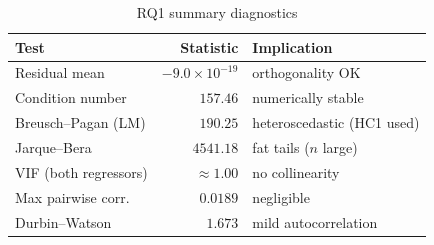 \documentclass[conference]{IEEEtran}
\begin{document}
\begin{table}[!t]
\caption{RQ1 summary diagnostics}
\label{tab:app_mlr}
\centering
\small
\begin{tabular}{lrl}
\toprule
Test & Statistic & Implication \\
\midrule
Residual mean         & $-9.0\times10^{-19}$ & orthogonality OK \\
Condition number      & $157.46$ & numerically stable \\
Breusch--Pagan (LM)   & $190.25$ & heteroscedastic (HC1 used) \\
Jarque--Bera          & $4541.18$ & fat tails ($n$ large) \\
VIF (both regressors) & $\approx 1.00$ & no collinearity \\
Max pairwise corr.    & $0.0189$ & negligible \\
Durbin--Watson        & $1.673$ & mild autocorrelation \\
\bottomrule
\end{tabular}
\end{table}

\nocite{*} %


\end{document}

